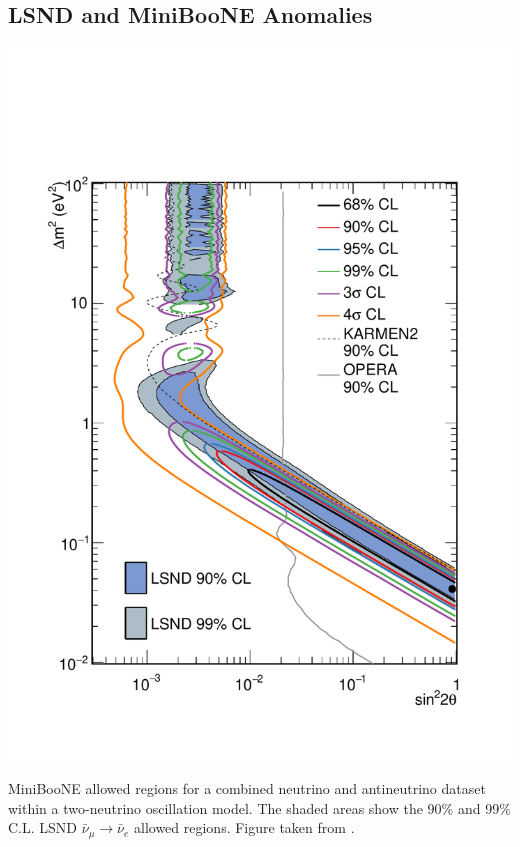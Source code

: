 \subsection{LSND and MiniBooNE Anomalies}
\begin{marginfigure}
    \centering
    \includegraphics{figures/theory/miniboone_fake_apr18_contNunubar_with_karmen_opera.pdf}
    \caption{MiniBooNE allowed regions for a combined neutrino and antineutrino dataset within a two-neutrino oscillation model.  The shaded areas show the 90\% and 99\% C.L. LSND $\bar{\nu}_{\mu}\rightarrow\bar{\nu}_e$ allowed regions. Figure taken from \cite{MiniBooNE:2018esg}.\label{fig:miniboone-lsnd-regions}}
\end{marginfigure}
